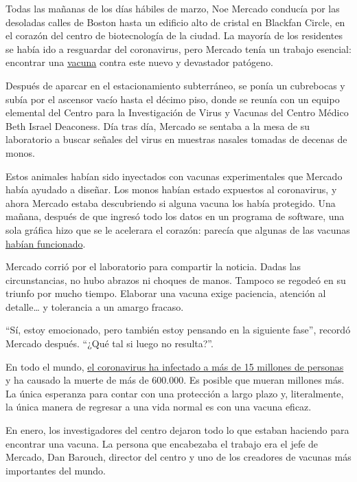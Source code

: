 Todas las mañanas de los días hábiles de marzo, Noe Mercado conducía por
las desoladas calles de Boston hasta un edificio alto de cristal en
Blackfan Circle, en el corazón del centro de biotecnología de la ciudad.
La mayoría de los residentes se había ido a resguardar del coronavirus,
pero Mercado tenía un trabajo esencial: encontrar una
\href{https://www.nytimes.com/2020/07/20/world/covid-coronavirus-vaccine.html}{vacuna}
contra este nuevo y devastador patógeno.

Después de aparcar en el estacionamiento subterráneo, se ponía un
cubrebocas y subía por el ascensor vacío hasta el décimo piso, donde se
reunía con un equipo elemental del Centro para la Investigación de Virus
y Vacunas del Centro Médico Beth Israel Deaconess. Día tras día, Mercado
se sentaba a la mesa de su laboratorio a buscar señales del virus en
muestras nasales tomadas de decenas de monos.

Estos animales habían sido inyectados con vacunas experimentales que
Mercado había ayudado a diseñar. Los monos habían estado expuestos al
coronavirus, y ahora Mercado estaba descubriendo si alguna vacuna los
había protegido. Una mañana, después de que ingresó todo los datos en un
programa de software, una sola gráfica hizo que se le acelerara el
corazón: parecía que algunas de las vacunas
\href{https://www.nytimes.com/2020/05/20/health/coronavirus-vaccine-harvard.html}{habían
funcionado}.

Mercado corrió por el laboratorio para compartir la noticia. Dadas las
circunstancias, no hubo abrazos ni choques de manos. Tampoco se regodeó
en su triunfo por mucho tiempo. Elaborar una vacuna exige paciencia,
atención al detalle\ldots{} y tolerancia a un amargo fracaso.

``Sí, estoy emocionado, pero también estoy pensando en la siguiente
fase'', recordó Mercado después. ``¿Qué tal si luego no resulta?''.

En todo el mundo,
\href{https://www.nytimes.com/interactive/2020/world/coronavirus-maps.html}{el
coronavirus ha infectado a más de 15 millones de personas} y ha causado
la muerte de más de 600.000. Es posible que mueran millones más. La
única esperanza para contar con una protección a largo plazo y,
literalmente, la única manera de regresar a una vida normal es con una
vacuna eficaz.

En enero, los investigadores del centro dejaron todo lo que estaban
haciendo para encontrar una vacuna. La persona que encabezaba el trabajo
era el jefe de Mercado, Dan Barouch, director del centro y uno de los
creadores de vacunas más importantes del mundo.

